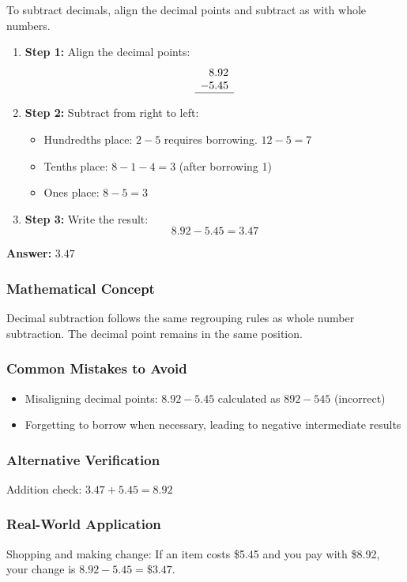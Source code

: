 \documentclass[12pt]{article}
\begin{document}
To subtract decimals, align the decimal points and subtract as with whole numbers.

\begin{enumerate}
\item \textbf{Step 1:} Align the decimal points:
  \[
  \begin{array}{r}
  8.92 \\
  -5.45 \\
  \hline
  \end{array}
  \]
\item \textbf{Step 2:} Subtract from right to left:
  \begin{itemize}
  \item Hundredths place: $2 - 5$ requires borrowing. $12 - 5 = 7$
  \item Tenths place: $8 - 1 - 4 = 3$ (after borrowing 1)
  \item Ones place: $8 - 5 = 3$
  \end{itemize}
\item \textbf{Step 3:} Write the result:
  \[
  8.92 - 5.45 = 3.47
  \]
\end{enumerate}

\textbf{Answer: } $3.47$

\subsubsection*{Mathematical Concept}
Decimal subtraction follows the same regrouping rules as whole number subtraction. The decimal point remains in the same position.

\subsubsection*{Common Mistakes to Avoid}
\begin{itemize}
\item Misaligning decimal points: $8.92 - 5.45$ calculated as $892 - 545$ (incorrect)
\item Forgetting to borrow when necessary, leading to negative intermediate results
\end{itemize}

\subsubsection*{Alternative Verification}
Addition check: $3.47 + 5.45 = 8.92$ 

\subsubsection*{Real-World Application}
Shopping and making change: If an item costs \$5.45 and you pay with \$8.92, your change is $8.92 - 5.45 = \$3.47$.
\end{document}
